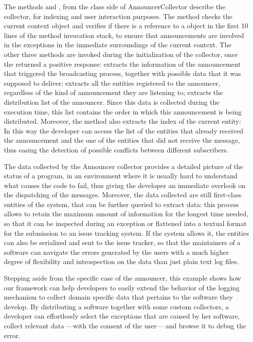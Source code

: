 The methods  and , from the class side of AnnouncerCollector describe the collector, for indexing and user interaction purposes.
The method  checks the current context object and verifies if there is a reference to a  object in the first 10 lines of the method invocation stack, to ensure that announcements are involved in the exceptions in the immediate surroundings of the current context.
The other three methods are invoked during the initialization of the collector, once the  returned a positive response:
 extracts the information of the announcement that triggered the broadcasting process, together with possible data that it was supposed to deliver;
 extracts all the entities registered to the announcer, regardless of the kind of announcement they are listening to;
 extracts the distribution list of the announcer.
Since this data is collected during the execution time, this list contains the order in which this announcement is being distributed. 
Moreover, the method also extracts the index of the current entity: In this way the developer can access the list of the entities that already received the announcement and the one of the entities that did not receive the message, thus easing the detection of possible conflicts between different subscribers.

The data collected by the Announcer collector provides a detailed picture of the status of a program, in an environment where it is usually hard to understand what causes the code to fail, thus giving the developer an immediate overlook on the dispatching of the messages.
Moreover, the data collected are still first-class entities of the system, that can be further queried to extract data: this process allows to retain the maximum amount of information for the longest time needed, so that it can be inspected during an exception or flattened into a textual format for the submission to an issue tracking system. If the system allows it, the entities can also be serialized and sent to the issue tracker, so that the maintainers of a software can navigate the errors generated by the users with a much higher degree of flexibility and introspection on the data than just plain text log files.

Stepping aside from the specific case of the announcer, this example shows how our framework can help developers to easily extend the behavior of the logging mechanism to collect domain specific data that pertains to the software they develop.
By distributing a software together with some custom collectors, a developer can effortlessly select the exceptions that are caused by her software, collect relevant data ---with the consent of the user--- and browse it to debug the error.


